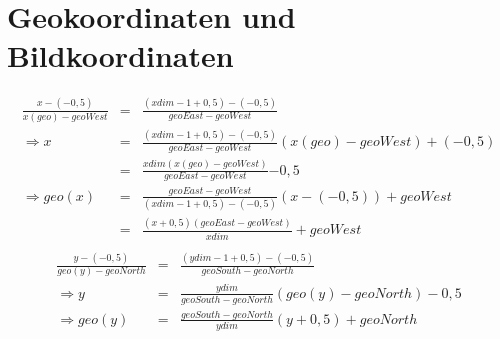 \chapter{Geokoordinaten und Bildkoordinaten}
\label{chap:geocoordinates}

\newpage
\begin{eqnarray*}
  \frac{x-(-0,5)}{x(geo)-geoWest}&=&\frac{(xdim-1+0,5)-(-0,5)}{geoEast-geoWest} \\
\Rightarrow x&=&
\frac{(xdim-1+0,5)-(-0,5)}{geoEast-geoWest}{\left(x(geo)-geoWest\right)+(-0,5)}
\\
&=&\frac{xdim\left(x(geo)-geoWest\right)}{geoEast-geoWest}{-0,5} \\
\Rightarrow
geo(x)&=&\frac{geoEast-geoWest}{(xdim-1+0,5)-(-0,5)}(x-(-0,5))+geoWest
\\
&=&\frac{(x+0,5)(geoEast-geoWest)}{xdim}+geoWest\\
\end{eqnarray*}
\begin{eqnarray*}
  \frac{y-(-0,5)}{geo(y)-geoNorth}&=&\frac{(ydim-1+0,5)-(-0,5)}{geoSouth-geoNorth} \\
  \Rightarrow y&=&\frac{ydim}{geoSouth-geoNorth}(geo(y)-geoNorth)-0,5
  \\
\Rightarrow geo(y)&=&\frac{geoSouth-geoNorth}{ydim}(y+0,5)+geoNorth\\
\end{eqnarray*}
